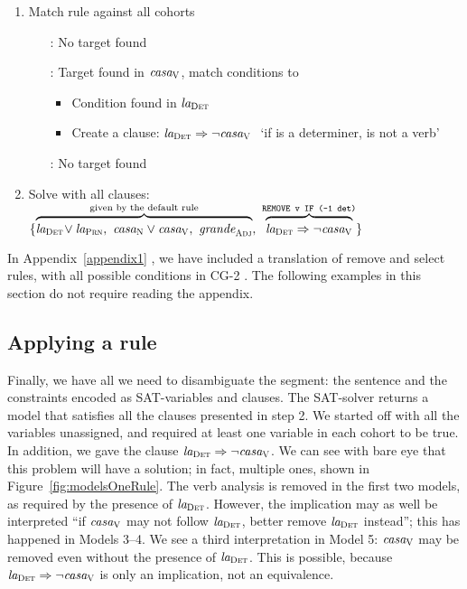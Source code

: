 \begin{enumerate}
\item Match rule against all cohorts
 \begin{itemize}
    \item[\la:] No target found
    \item[\casa:] Target found in $\text{\em casa}_{\text{\sc V}}$, match conditions to \la
      \begin{itemize}
       \item Condition found in $\text{\em la}_{\text{\sc Det}}$
       \item Create a clause: $\text{\em la}_{\text{\sc Det}} \Rightarrow \neg \text{\em casa}_{\text{\sc V}} \ $ `if \la{} is a determiner, \casa{} is not a verb'
      \end{itemize}
    \item[\grande:] No target found
  \end{itemize}
\item Solve with all clauses: 
  $\{ \ob{\laDet \! \vee \laPrn, \ \casaN \vee \casaV, \  \grandeAdj}^{\text{given by the default rule}}, \ 
      \ob{\laDet \Rightarrow \neg \casaV}^{\t{REMOVE v IF (-1 det)}} \}$
\end{enumerate}

In Appendix~\ref{appendix1}
, we have included a translation of {\sc remove} and {\sc select} rules, with all possible conditions in CG-2 . The following examples in this section do not require reading the appendix.

\subsection{Applying a rule}


Finally, we have all we need to disambiguate the segment: the sentence and the constraints encoded as SAT-variables and clauses. The SAT-solver returns a model that satisfies all the clauses presented in step 2.
We started off with all the variables unassigned, and required at least one variable 
in each cohort to be true. In addition, we gave the clause $\text{\em la}_{\text{\sc Det}} \Rightarrow \neg \text{\em casa}_{\text{\sc V}}$.
We can see with bare eye that this problem will have a solution; in fact, multiple ones, 
shown in Figure~\ref{fig:modelsOneRule}.
The verb analysis is removed in the first two models, as required by the presence of $\text{\em la}_{\text{\sc Det}}$. However, the implication may as well be interpreted ``if $\text{\em casa}_{\text{\sc V}}$ may not follow $\text{\em la}_{\text{\sc Det}}$, better remove $\text{\em la}_{\text{\sc Det}}$ instead''; this has happened in Models 3--4. 
We see a third interpretation in Model 5: $\text{\em casa}_{\text{\sc V}}$ may be removed even without 
the presence of $\text{\em la}_{\text{\sc Det}}$. This is possible, because $\text{\em la}_{\text{\sc Det}} \Rightarrow \neg \text{\em casa}_{\text{\sc V}}$ is only an implication, not an equivalence.

